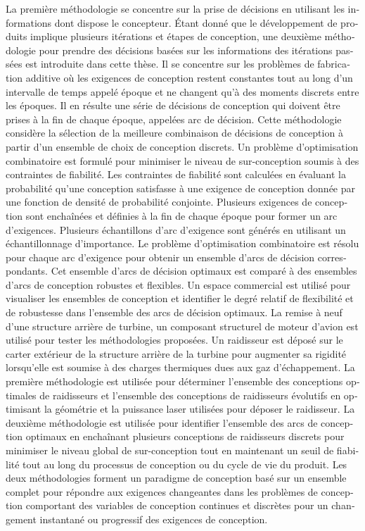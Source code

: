 \documentclass[12pt,Bold,letterpaper,TexShade,twoside]{mcgilletdclass}
\begin{document}
\begin{romanPagenumber}{2}
\begin{otherlanguage}{french}
{La première méthodologie se concentre sur la prise de décisions en utilisant les informations dont dispose le concepteur. Étant donné que le développement de produits implique plusieurs itérations et étapes de conception, une deuxième méthodologie pour prendre des décisions basées sur les informations des itérations passées est introduite dans cette thèse. Il se concentre sur les problèmes de fabrication additive où les exigences de conception restent constantes tout au long d'un intervalle de temps appelé époque et ne changent qu'à des moments discrets entre les époques. Il en résulte une série de décisions de conception qui doivent être prises à la fin de chaque époque, appelées arc de décision. Cette méthodologie considère la sélection de la meilleure combinaison de décisions de conception à partir d'un ensemble de choix de conception discrets. Un problème d'optimisation combinatoire est formulé pour minimiser le niveau de sur-conception soumis à des contraintes de fiabilité. Les contraintes de fiabilité sont calculées en évaluant la probabilité qu'une conception satisfasse à une exigence de conception donnée par une fonction de densité de probabilité conjointe. Plusieurs exigences de conception sont enchaînées et définies à la fin de chaque époque pour former un arc d'exigences. Plusieurs échantillons d'arc d'exigence sont générés en utilisant un échanti\-llonnage d'importance. Le problème d'optimisation combinatoire est résolu pour chaque arc d'exi\-gence pour obtenir un ensemble d'arcs de décision correspondants. Cet ensemble d'arcs de décision optimaux est comparé à des ensembles d'arcs de conception robustes et flexibles. Un espace commercial est utilisé pour visualiser les ensembles de conception et identifier le degré relatif de flexibilité et de robustesse dans l'ensemble des arcs de décision optimaux.
La remise à neuf d'une structure arrière de turbine, un composant structurel de moteur d'avion est utilisé pour tester les méthodologies proposées. Un raidisseur est déposé sur le carter extérieur de la structure arrière de la turbine pour augmenter sa rigidité lorsqu'elle est soumise à des charges thermiques dues aux gaz d'échappement. La première méthodologie est utilisée pour déterminer l'ensemble des conceptions optimales de raidisseurs et l'ensemble des conceptions de raidisseurs évolutifs en optimisant la géométrie et la puissance laser utilisées pour déposer le raidisseur. La deuxième méthodologie est utilisée pour identifier l’ensemble des arcs de conception optimaux en enchaînant plusieurs conceptions de raidisseurs discrets pour minimiser le niveau global de sur-conception tout en maintenant un seuil de fiabilité tout au long du processus de conception ou du cycle de vie du produit.
Les deux méthodologies forment un paradigme de conception basé sur un ensemble complet pour répondre aux exigences changeantes dans les problèmes de conception comportant des variables de conception continues et discrètes pour un changement instantané ou progressif des exigences de conception.}%
\AbstractFr%
\end{otherlanguage}
%
%
%
\tableofcontents %
\listoftables %
\listoffigures %


\end{romanPagenumber}
\end{document}
